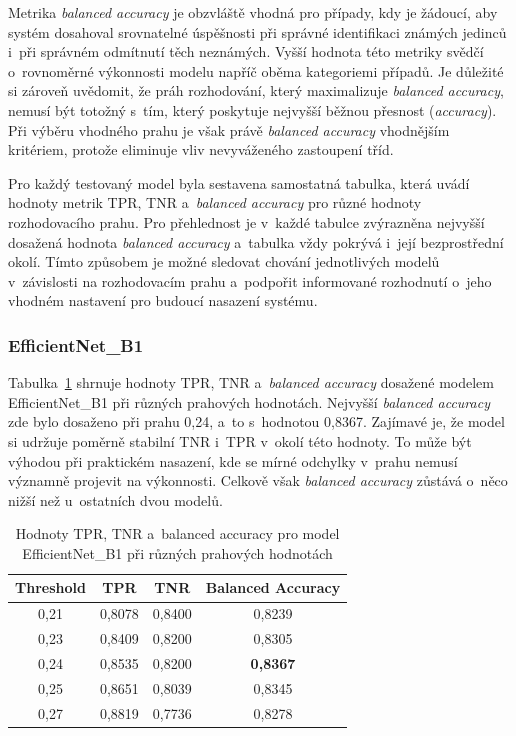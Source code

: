 Metrika \textit{balanced accuracy} je obzvláště vhodná pro případy, kdy je žádoucí, aby systém dosahoval srovnatelné úspěšnosti při správné identifikaci známých jedinců i~při správném odmítnutí těch neznámých. Vyšší hodnota této metriky svědčí o~rovnoměrné výkonnosti modelu napříč oběma kategoriemi případů. Je důležité si zároveň uvědomit, že práh rozhodování, který maximalizuje \textit{balanced accuracy}, nemusí být totožný s~tím, který poskytuje nejvyšší běžnou přesnost (\textit{accuracy}). Při výběru vhodného prahu je však právě \textit{balanced accuracy} vhodnějším kritériem, protože eliminuje vliv nevyváženého zastoupení tříd.

Pro každý testovaný model byla sestavena samostatná tabulka, která uvádí hodnoty metrik TPR, TNR a~\textit{balanced accuracy} pro různé hodnoty rozhodovacího prahu. Pro přehlednost je v~každé tabulce zvýrazněna nejvyšší dosažená hodnota \textit{balanced accuracy} a~tabulka vždy pokrývá i~její bezprostřední okolí. Tímto způsobem je možné sledovat chování jednotlivých modelů v~závislosti na rozhodovacím prahu a~podpořit informované rozhodnutí o~jeho vhodném nastavení pro budoucí nasazení systému.




\subsubsection*{EfficientNet\_B1}
Tabulka~\ref{efficientnetMetrics} shrnuje hodnoty TPR, TNR a~\textit{balanced accuracy} dosažené modelem EfficientNet\_B1 při různých prahových hodnotách. Nejvyšší \textit{balanced accuracy} zde bylo dosaženo při prahu 0,24, a~to s~hodnotou 0,8367. Zajímavé je, že model si udržuje poměrně stabilní TNR i~TPR v~okolí této hodnoty. To může být výhodou při praktickém nasazení, kde se mírné odchylky v~prahu nemusí významně projevit na výkonnosti. Celkově však \textit{balanced accuracy} zůstává o~něco nižší než u~ostatních dvou modelů.


\begin{table}[h!]
	\centering
	\begin{tabular}{|c|c|c|c|}
		\hline
		\textbf{Threshold} & \textbf{TPR} & \textbf{TNR} & \textbf{Balanced Accuracy} \\ \hline
		0,21 & 0,8078 & 0,8400 & 0,8239 \\ \hline
		0,23 & 0,8409 & 0,8200 & 0,8305 \\ \hline
		0,24 & 0,8535 & 0,8200 & \textbf{0,8367} \\ \hline
		0,25 & 0,8651 & 0,8039 & 0,8345 \\ \hline
		0,27 & 0,8819 & 0,7736 & 0,8278 \\ \hline
	\end{tabular}
	\caption{Hodnoty TPR, TNR a~balanced accuracy pro model EfficientNet\_B1 při různých prahových hodnotách}
	\label{efficientnetMetrics}
\end{table}

